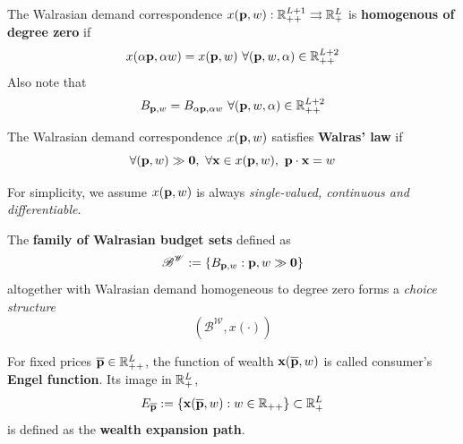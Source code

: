\documentclass{report}
\begin{document}
 			\begin{definition}[2.E.1]
 				The Walrasian demand correspondence $x(\textbf{p}, w): \mathbb{R}_{++}^{L+1} \rightrightarrows \mathbb{R}_+^L$ is \textbf{homogenous of degree zero} if 
 				\begin{equation}
 					x(\alpha \textbf{p}, \alpha w) = x(\textbf{p}, w)\ \forall (\textbf{p}, w, \alpha) \in \mathbb{R}_{++}^{L+2}
 				\end{equation}
 				Also note that
 				\begin{equation}
 					B_{\textbf{p}, w} = B_{\alpha \textbf{p}, \alpha w}\ \forall (\textbf{p}, w, \alpha) \in \mathbb{R}_{++}^{L+2}
 				\end{equation}
 			\end{definition}
 			
 			\begin{definition}[2.E.2]
 				The Walrasian demand correspondence $x(\textbf{p}, w)$ satisfies \textbf{Walras' law} if
 				\begin{equation}
 					\forall (\textbf{p}, w) \gg \textbf{0},\ \forall \textbf{x} \in x(\textbf{p}, w),\ \textbf{p} \cdot \textbf{x} = w
 				\end{equation}
 			\end{definition}
 			
 			\begin{assumption}
 				For simplicity, we assume $x(\textbf{p}, w)$ is always \emph{single-valued, continuous and differentiable}.
 			\end{assumption}
 			
 			\begin{proposition}
 				The \textbf{family of Walrasian budget sets} defined as
 				\begin{equation}
 					\mathscr{B}^{\mathscr{W}} := \{B_{\textbf{p}, w}: {\textbf{p}, w} \gg \textbf{0}\}
 				\end{equation}
 				altogether with Walrasian demand homogeneous to degree zero forms a \emph{choice structure}
 				\begin{equation}
 					(\mathscr{B}^{\mathscr{W}}, x(\cdot))
 				\end{equation} 
 			\end{proposition}
 		
 			\begin{definition}
 				For fixed prices $\overline{\textbf{p}} \in \mathbb{R}_{++}^L$, the function of wealth $\textbf{x}(\overline{\textbf{p}}, w)$ is called consumer's \textbf{Engel function}. Its image in $\mathbb{R}^L_+$,
 				\begin{equation}
 					E_{\overline{\textbf{p}}} := \{\textbf{x}(\overline{\textbf{p}}, w): w \in \mathbb{R}_{++}\} \subset \mathbb{R}^L_+
 				\end{equation}
 				is defined as the \textbf{wealth expansion path}.
 			\end{definition}
 			
\end{document}
